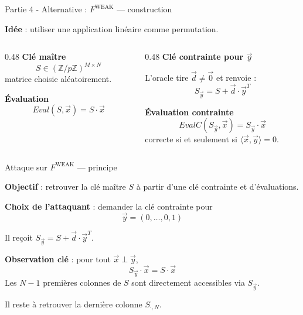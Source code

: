 \documentclass{beamer}
\begin{document}
\begin{frame}{Partie 4 - Alternative : $F^{\mathrm{WEAK}}$ --- construction}

\textbf{Idée} : utiliser une application linéaire comme permutation.

\vspace{0.3cm}

\begin{columns}[t]
\begin{column}{0.48\textwidth}
\textbf{Clé maître}
\[
S \in (\mathbb{Z}/p\mathbb{Z})^{M \times N}
\]
matrice choisie aléatoirement.

\vspace{0.3cm}

\textbf{Évaluation}
\[
\mathit{Eval}(S, \vec{x}) = S \cdot \vec{x}
\]
\end{column}
\begin{column}{0.48\textwidth}
\textbf{Clé contrainte pour $\vec{y}$}

L'oracle tire $\vec{d} \neq \vec{0}$ et renvoie :
\[
S_{\vec{y}} = S + \vec{d} \cdot \vec{y}^T
\]

\vspace{0.3cm}

\textbf{Évaluation contrainte}
\[
\mathit{EvalC}(S_{\vec{y}}, \vec{x}) = S_{\vec{y}} \cdot \vec{x}
\]
correcte si et seulement si $\langle \vec{x}, \vec{y} \rangle = 0$.
\end{column}
\end{columns}

\end{frame}

\begin{frame}{Attaque sur $F^{\mathrm{WEAK}}$ --- principe}

\textbf{Objectif} : retrouver la clé maître $S$ à partir d'une clé contrainte et d'évaluations.

\vspace{0.3cm}

\textbf{Choix de l'attaquant} : demander la clé contrainte pour
\[
\vec{y} = (0, \ldots, 0, 1)
\]

Il reçoit $S_{\vec{y}} = S + \vec{d} \cdot \vec{y}^T$.

\vspace{0.3cm}

\textbf{Observation clé} : pour tout $\vec{x} \perp \vec{y}$,
\[
S_{\vec{y}} \cdot \vec{x} = S \cdot \vec{x}
\]
Les $N-1$ premières colonnes de $S$ sont directement accessibles via $S_{\vec{y}}$.

\vspace{0.3cm}

Il reste à retrouver la dernière colonne $S_{\cdot, N}$.

\end{frame}
\end{document}

